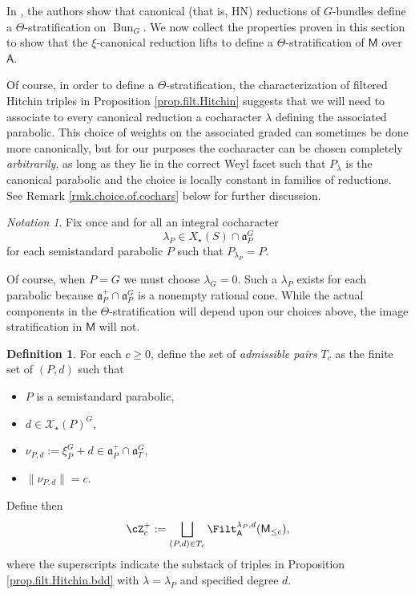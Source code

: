 \documentclass[openany]{amsbook}
\theoremstyle{definition}
\newtheorem{definition}[theorem]{Definition}
\theoremstyle{remark}
\newtheorem{notation}[theorem]{Notation}
\numberwithin{equation}{section}
\newcommand{\cX}{\mathcal{X}}
\renewcommand{\-}{\operatorname{-}}
\renewcommand{\a}{\mathfrak{a}}
\newcommand{\on}[1]{\operatorname{#1}}
\newcommand{\bM}{\mathsf{M}}
\newcommand{\bA}{\mathsf{A}}
\newcommand{\narcone}{\a^+}
\newcommand{\Bun}{\on{Bun}}
\begin{document}
In \cite[\S 8]{AHLHModuliForStacks}, the authors show that canonical (that is, HN) reductions of $G$-bundles define a $\Theta$-stratification on $\Bun_G$. We now collect the properties proven in this section to show that the $\xi$-canonical reduction lifts to define a $\Theta$-stratification of $\bM$ over $\bA$.

Of course, in order to define a $\Theta$-stratification, the characterization of filtered Hitchin triples in Proposition \ref{prop.filt.Hitchin} suggests that we will need to associate to every canonical reduction a cocharacter $\lambda$ defining the associated parabolic. This choice of weights on the associated graded can sometimes be done more canonically, but for our purposes the cocharacter can be chosen completely \textit{arbitrarily}, as long as they lie in the correct Weyl facet such that $P_\lambda$ is the canonical parabolic and the choice is locally constant in families of reductions. See Remark \ref{rmk.choice.of.cochars} below for further discussion.

\begin{notation}\label{not.cochar.for.parabolic}
    Fix once and for all an integral cocharacter 
    $$
        \lambda_P \in X_\star(S) \cap \a_P^G
    $$
    for each semistandard parabolic $P$ such that $P_{\lambda_P} = P$.
\end{notation}
Of course, when $P = G$ we must choose $\lambda_G = 0$. Such a $\lambda_P$ exists for each parabolic because $\narcone_P \cap \a_P^G$ is a nonempty rational cone. While the actual components in the $\Theta$-stratification will depend upon our choices above, the image stratification in $\bM$ will not.

\begin{definition}\label{def.theta.strata}
    For each $c \ge 0$, define the set of \emph{admissible pairs} $T_c$ as the finite set of $(P,d)$ such that
    \begin{itemize}
        \item $P$ is a semistandard parabolic,
        \item $d \in \cX_\star(P)^G$,
        \item $\nu_{P,d} := \xi_P^G + d \in \narcone_P \cap \a_T^G$,
        \item $\| \nu_{P,d}\| = c$.
    \end{itemize}
    Define then
    $$
        \cZ^+_c := \bigsqcup_{(P, d) \in T_c} \Filt_{\bA}^{\lambda_P, d}(\bM_{\le c}),
    $$
    where the superscripts indicate the substack of triples in Proposition \ref{prop.filt.Hitchin.bdd} with $\lambda = \lambda_P$ and specified degree $d$. 
\end{definition}
\end{document}
